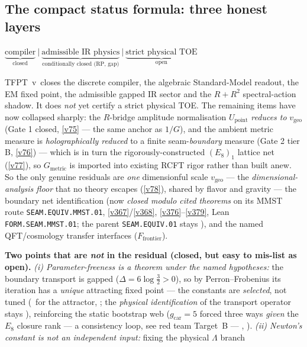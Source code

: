 \documentclass[11pt,a4paper]{article}
\newcommand{\gcar}{g_{\mathrm{car}}}
\begin{document}
\subsection*{The compact status formula: three honest layers}
\begin{keyeq}
$\displaystyle \underbrace{\text{compiler}}_{\text{closed}}\ \Big|\
  \underbrace{\text{admissible IR physics}}_{\text{conditionally closed (RP, gap)}}\ \Big|\
  \underbrace{\text{strict physical TOE}}_{\text{open}}$
\end{keyeq}
TFPT~v\TFPTversion\ closes the discrete compiler, the algebraic Standard-Model readout, the EM fixed point, the
admissible gapped IR sector and the $R+R^2$ spectral-action shadow. It does \emph{not} yet certify a strict
physical TOE. The remaining items have now collapsed sharply: the $R$-bridge amplitude normalisation
$U_{\mathrm{point}}$ \emph{reduces to} $v_{\mathrm{geo}}$ (Gate 1 closed, \vref{v75} --- the same anchor as $1/G$), and
the ambient metric measure is \emph{holographically reduced} to a finite seam-\emph{boundary} measure (Gate 2
tier B, \vref{v76}) --- which is in turn the rigorously-constructed $(E_8)_1$ lattice net (\vref{v77}), so $G_{\mathrm{metric}}$
is imported into existing RCFT rigor rather than built anew. So the only genuine residuals are \emph{one}
dimensionful scale $v_{\mathrm{geo}}$ --- the \emph{dimensional-analysis floor} that no theory escapes (\vref{v78}),
shared by flavor and gravity --- the boundary net identification (now \emph{closed modulo cited theorems} on its
MMST route \texttt{SEAM.EQUIV.MMST.01},
\vref{v367}/\vref{v368}, \vref{v376}--\vref{v379}, Lean \texttt{FORM.SEAM.MMST.01}; the parent
\texttt{SEAM.EQUIV.01} stays \mO), and the named QFT/cosmology transfer
interfaces ($F_{\mathrm{frontier}}$).
\par\smallskip\noindent\textbf{Two points that are \emph{not} in the residual (closed, but easy to mis-list as open).}
\emph{(i) Parameter-freeness is a theorem under the named hypotheses:} the boundary transport is gapped
($\Delta=6\log\tfrac32>0$), so by Perron--Frobenius its iteration has a \emph{unique} attracting fixed point
--- the constants are \emph{selected}, not tuned (\mE\ for the attractor, ;
the \emph{physical identification} of the transport operator stays \mC), reinforcing the
static bootstrap web ($\gcar=5$ forced three ways \emph{given} the $E_8$ closure rank --- a consistency
loop, see red team Target~B --- \veri{v6\_bootstrap.py}, ).
\emph{(ii) Newton's constant is not an \emph{independent} input:} fixing the physical $\Lambda$ branch
\end{document}
